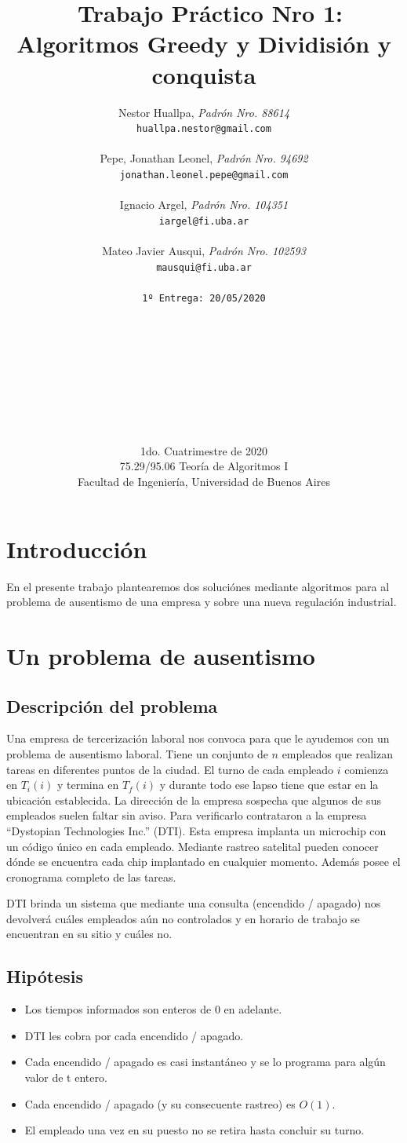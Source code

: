 \documentclass{article}
\title{	\ Trabajo Práctico Nro 1: Algoritmos Greedy y Dividisión y conquista}
\author{    Nestor Huallpa, \textit{Padrón Nro. 88614}\\
            \texttt{ huallpa.nestor@gmail.com }\\\\  
            Pepe, Jonathan Leonel, \textit{Padrón Nro. 94692}\\
            \texttt{ jonathan.leonel.pepe@gmail.com }\\\\     
            Ignacio Argel, \textit{Padrón Nro. 104351}\\
            \texttt{ iargel@fi.uba.ar }\\\\      
            Mateo Javier Ausqui, \textit{Padrón Nro. 102593}\\
            \texttt{ mausqui@fi.uba.ar }\\\\              
            \texttt{\footnotesize 1º Entrega: 20/05/2020}\\
            \\\\\\\\\\\\\\\\\\
            \normalsize{1do. Cuatrimestre de 2020}\\ 
            \normalsize{75.29/95.06 Teoría de Algoritmos I} \\
            \normalsize{Facultad de Ingeniería, Universidad de Buenos Aires} \\}
\date{}
\begin{document}
\maketitle
\thispagestyle{empty}

\newpage{}
\tableofcontents

\thispagestyle{empty}

\newpage{}

\newpage
\section{Introducción}

En el presente trabajo plantearemos dos soluciónes mediante algoritmos para al problema de ausentismo de una empresa y sobre una nueva regulación industrial. 

\section{Un problema de ausentismo}

\subsection{Descripción del problema}

Una empresa de tercerización laboral nos convoca para que le ayudemos con un problema de ausentismo laboral. 
Tiene un conjunto de \(n\) empleados que realizan tareas en diferentes puntos de la ciudad. 
El turno de cada empleado \(i\) comienza en \(T_i(i)\) y termina en \(T_f(i)\) y durante todo ese lapso tiene que estar en la ubicación establecida. 
La dirección de la empresa sospecha que algunos de sus empleados suelen faltar sin aviso. Para verificarlo contrataron a la empresa “Dystopian Technologies Inc.” (DTI). 
Esta empresa implanta un microchip con un código único en cada empleado. Mediante rastreo satelital pueden conocer dónde se encuentra cada chip implantado en cualquier momento. Además posee el cronograma completo de las tareas.

DTI brinda un sistema que mediante una consulta (encendido / apagado) nos devolverá cuáles empleados aún no controlados y en horario de trabajo se encuentran en su sitio y cuáles no.
\subsection{Hipótesis}
\begin{itemize}
    \item Los tiempos informados son enteros de 0 en adelante.
    \item DTI les cobra por cada encendido / apagado.
    \item Cada encendido / apagado es casi instantáneo y se lo programa para algún valor de t entero.
    \item Cada encendido / apagado (y su consecuente rastreo) es \(O(1)\).
    \item El empleado una vez en su puesto no se retira hasta concluir su turno.
\end{itemize}
\end{document}
